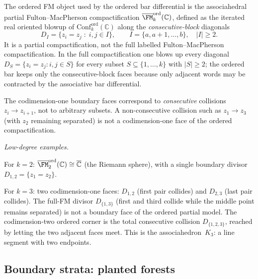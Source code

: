 \begin{construction}
\label{constr:ordered-fm-compact}
The ordered FM object used by the ordered bar differential is the
associahedral partial Fulton--MacPherson compactification
$\overline{\FM}_k^{\mathrm{ord}}(\mathbb C)$, defined as the
iterated real oriented blowup of
$\mathrm{Conf}_k^{\mathrm{ord}}(\mathbb C)$ along the
\emph{consecutive-block} diagonals
\[
D_I=\{z_i=z_j\;:\; i,j\in I\},\qquad
I=\{a,a+1,\dots,b\},\quad |I|\ge2.
\]
It is a partial compactification, not the full labelled
Fulton--MacPherson compactification. In the full compactification one
blows up every diagonal $D_S=\{z_i=z_j:i,j\in S\}$ for every subset
$S\subseteq\{1,\dots,k\}$ with $|S|\ge2$; the ordered bar keeps only
the consecutive-block faces because only adjacent words may be
contracted by the associative bar differential.

The codimension-one boundary faces correspond to
\emph{consecutive} collisions $z_i\to z_{i+1}$, not to
arbitrary subsets. A non-consecutive collision such as
$z_1\to z_3$ (with $z_2$ remaining separated) is not a
codimension-one face of the ordered compactification.

\medskip
\noindent\emph{Low-degree examples.}

For $k=2$:
$\overline{\FM}_2^{\mathrm{ord}}(\mathbb C)
\cong\overline{\mathbb C}$ (the Riemann sphere), with a
single boundary divisor $D_{1,2}=\{z_1=z_2\}$.

For $k=3$: two codimension-one faces: $D_{1,2}$ (first pair
collides) and $D_{2,3}$ (last pair collides). The full-FM divisor
$D_{\{1,3\}}$ (first and third collide while the middle point remains
separated) is not a boundary face of the ordered partial model. The
codimension-two ordered corner is the total consecutive collision
$D_{\{1,2,3\}}$, reached by letting the two adjacent faces meet. This
is the associahedron~$K_3$: a line segment with two endpoints.
\end{construction}

\subsection{Boundary strata: planted forests}
\label{subsec:boundary-strata-planted}

